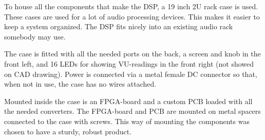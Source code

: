 To house all the components that make the DSP, a 19 inch 2U rack case is used. These cases are used for a lot of audio processing devices. This makes it easier to keep a system organized. The DSP fits nicely into an existing audio rack somebody may use.
\par 
\noindent The case is fitted with all the needed ports on the back, a screen and knob in the front left, and 16 LEDs for showing VU-readings in the front right (not showed on CAD drawing). Power is connected via a metal female DC connector so that, when not in use, the case has no wires attached. 
\par
\noindent Mounted inside the case is an FPGA-board and a custom PCB loaded with all the needed converters. The FPGA-board and PCB are mounted on metal spacers connected to the case with screws. This way of mounting the components was chosen to have a sturdy, robust product.



\newpage 